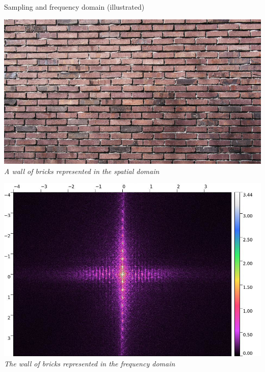 \begin{frame}{Sampling and frequency domain (illustrated)}
  \begin{center}
  \begin{minipage}[b]{0.45\textwidth}
    \centering
    \includegraphics[width=\textwidth]{slides/graphics-theory/bricks.jpg}\\
    \textit{\small A wall of bricks represented in the spatial domain}
  \end{minipage}
  \hfill
  \begin{minipage}[b]{0.45\textwidth}
    \centering
    \includegraphics[width=\textwidth]{slides/graphics-theory/bricks-fft.jpg}\\
    \textit{\small The wall of bricks represented in the frequency domain}
  \end{minipage}

  \end{center}
\end{frame}

